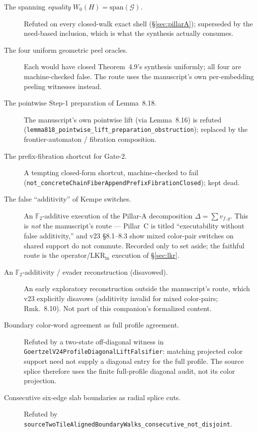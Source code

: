 \documentclass[11pt]{article}
\theoremstyle{definition}
\newcommand{\FF}{\mathbb{F}_2}
\newcommand{\Wz}{W_0}
\newcommand{\LKR}{\mathrm{LKR}_{\mathrm{in}}}
\begin{document}
\begin{description}
  \item[The spanning \emph{equality} $\Wz(H)=\mathrm{span}(\mathcal{G})$.] Refuted
        on every closed-walk exact shell (\S\ref{sec:pillarA}); superseded by the
        need-based inclusion, which is what the synthesis actually consumes.
  \item[The four uniform geometric peel oracles.] Each would have closed
        Theorem~4.9's synthesis uniformly; all four are machine-checked false.
        The route uses the manuscript's own per-embedding peeling witnesses
        instead.
  \item[The pointwise Step-1 preparation of Lemma~8.18.] The manuscript's own
        pointwise lift (via Lemma~8.16) is refuted
        (\texttt{lemma818\_pointwise\_lift\_preparation\_obstruction}); replaced by
        the frontier-automaton / fibration composition.
  \item[The prefix-fibration shortcut for Gate-2.] A tempting closed-form
        shortcut, machine-checked to fail
        (\texttt{not\_concreteChainFiberAppendPrefixFibrationClosed}); kept dead.
  \item[The false ``additivity'' of Kempe switches.] An $\FF$-additive execution
        of the Pillar-A decomposition $\Delta=\sum v_{f,g}$. This is \emph{not}
        the manuscript's route --- Pillar~C is titled ``executability without
        false additivity,'' and v23 \S8.1--8.3 show mixed color-pair switches on
        shared support do not commute. Recorded only to set aside; the faithful
        route is the operator/$\LKR$ execution of \S\ref{sec:lkr}.
  \item[An $\FF$-additivity / evader reconstruction (disavowed).] An early
        exploratory reconstruction outside the manuscript's route, which v23
        explicitly disavows (additivity invalid for mixed color-pairs; Rmk.~8.10).
        Not part of this companion's formalized content.
  \item[Boundary color-word agreement as full profile agreement.] Refuted by a
        two-state off-diagonal witness in
        \texttt{GoertzelV24ProfileDiagonalLiftFalsifier}: matching projected
        color support need not supply a diagonal entry for the full profile.
        The source splice therefore uses the finite full-profile diagonal
        audit, not its color projection.
  \item[Consecutive six-edge slab boundaries as radial splice cuts.] Refuted by
        \texttt{sourceTwoTileAlignedBoundaryWalks\_consecutive\_not\_disjoint}.

\end{description}
\end{document}
